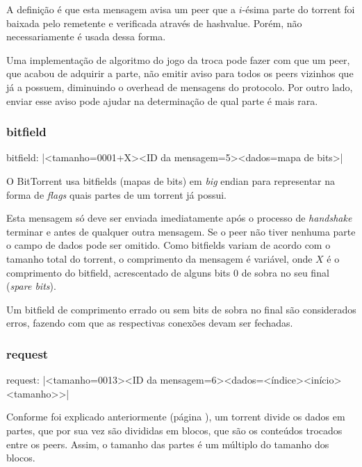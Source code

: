 A definição é que esta mensagem avisa um \gls*{peer} que a $i$-ésima parte do
\gls*{torrent} foi baixada pelo remetente e verificada através de \gls*{hashvalue}.
Porém, não necessariamente é usada dessa forma.


Uma implementação de algoritmo do jogo da troca pode fazer com que um \gls*{peer}, que
acabou de adquirir a parte, não emitir aviso para todos os \glspl*{peer} vizinhos que já
a possuem, diminuindo o \gls{overhead} de mensagens do protocolo. Por outro lado, enviar
esse aviso pode ajudar na determinação de qual parte é mais rara.

\subsubsection*{bitfield}

bitfield: \bverb|<tamanho=0001+X><ID da mensagem=5><dados=mapa de bits>|

O BitTorrent usa bitfields (mapas de bits) em \emph{big} \gls*{endian} para representar
na forma de \emph{flags} quais partes de um \gls*{torrent} já possui.

Esta mensagem só deve ser enviada imediatamente após o processo de \emph{handshake}
terminar e antes de qualquer outra mensagem. Se o \gls*{peer} não tiver nenhuma parte o
campo de dados pode ser omitido. Como bitfields variam de acordo com o tamanho total do
\gls*{torrent}, o comprimento da mensagem é variável, onde $X$ é o comprimento do
bitfield, acrescentado de alguns bits 0 de sobra no seu final (\emph{spare bits}).

Um bitfield de comprimento errado ou sem bits de sobra no final são considerados erros,
fazendo com que as respectivas conexões devam ser fechadas.


\subsubsection*{request}

request: \bverb|<tamanho=0013><ID da mensagem=6><dados=<índice><início><tamanho>>|

Conforme foi explicado anteriormente (página \pageref{subsec:partes}), um
\gls*{torrent} divide os dados em partes, que por sua vez são divididas em blocos, que
são os conteúdos trocados entre os \glspl*{peer}. Assim, o tamanho das partes é um
múltiplo do tamanho dos blocos.

